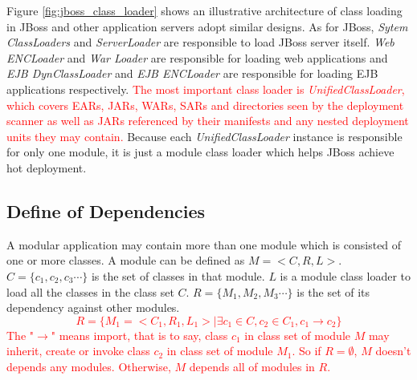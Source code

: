 \documentclass[conference]{IEEEtran}
\begin{document}
Figure \ref{fig:jboss_class_loader}  shows an illustrative architecture of class loading in JBoss and other application servers adopt similar designs. As for JBoss, \emph{Sytem ClassLoaders} and \emph{ServerLoader} are responsible to load JBoss server itself. \emph{Web ENCLoader} and \emph{War Loader} are responsible for loading web applications and \emph{EJB DynClassLoader} and \emph{EJB ENCLoader} are responsible for loading EJB applications respectively. \textcolor{red}{The most important class loader is \emph{UnifiedClassLoader}, which covers EARs, JARs, WARs, SARs and directories seen by the deployment scanner as well as JARs referenced by their manifests and any nested deployment units they may contain\cite{jboss_class_loader}.} Because each \emph{UnifiedClassLoader} instance is responsible for only one module, it is just a module class loader which helps JBoss achieve hot deployment.







\subsection{Define of Dependencies} 

A modular application may contain more than one module which is consisted of one or more classes. 
A module can be defined as $M=<C, R, L>$. $C=\{c_1, c_2, c_3\cdots\}$  is the set of classes in that module. $L$ is a module class loader to load all the classes in the class set $C$. $R=\{M_1, M_2, M_3\cdots\}$ is the set of its dependency against other modules. 
\textcolor{red}{$$R=\{M_1=<C_1, R_1, L_1> \mid \exists c_1 \in C, c_2 \in C_1, c_1 \rightarrow c_2\}$$
The "$\rightarrow$" means import, that is to say, class $c_1$ in class set of module $M$ may inherit, create or invoke class $c_2$ in class set of module $M_1$. 
So if $R=\emptyset$, $M$ doesn't depends any modules.
Otherwise, $M$ depends all of modules in $R$.
}
\end{document}

